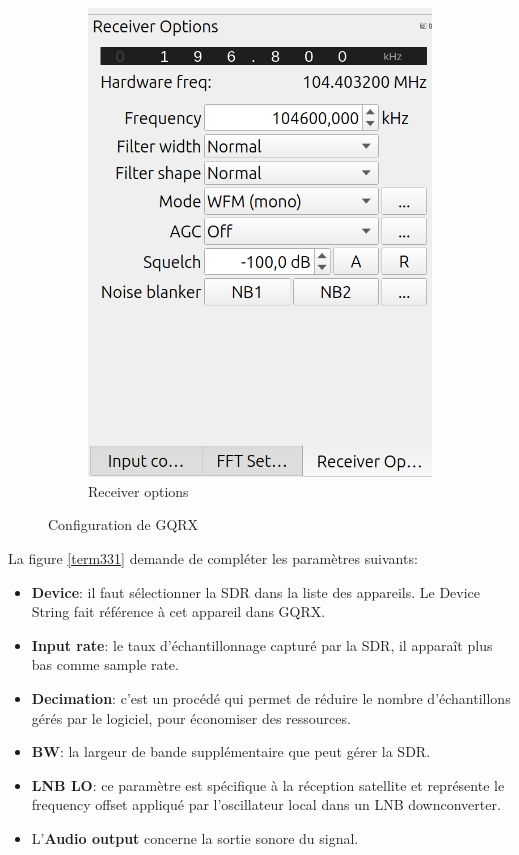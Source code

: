 \begin{figure}[h]
\begin{subfigure}{0.35\textwidth}
  \includegraphics[width=\textwidth]{images/gqrx3.png}
  \caption{Receiver options}
  \label{term341}
\end{subfigure}
\caption{Configuration de GQRX}
\label{term37}
\end{figure}

La figure \ref{term331} demande de compléter les paramètres suivants:

\vspace{0.1cm}

\begin{itemize}
\item \textbf{Device}: il faut sélectionner la \ac{SDR} dans la liste des appareils. Le Device String fait référence à cet appareil dans GQRX.
\item \textbf{Input rate}: le taux d'échantillonnage capturé par la \ac{SDR}, il apparaît plus bas comme sample rate.
\item \textbf{Decimation}: c'est un procédé qui permet de réduire le nombre d'échan\-tillons gérés par le logiciel, pour économiser des ressources.
\item \textbf{\ac{BW}}: la largeur de bande supplémentaire que peut gérer la \ac{SDR}.
\item \textbf{\ac{LNB LO}}: ce paramètre est spécifi\-que à la réception satellite et représente le frequency offset appliqué par l'oscillateur local dans un LNB downconverter.
\item L'\textbf{Audio output} concerne la sortie sonore du signal.
\end{itemize}


